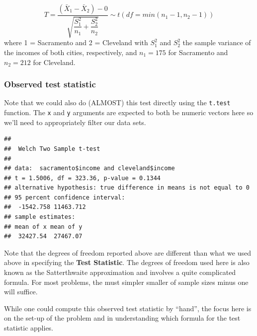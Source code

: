 \documentclass[]{tufte-book}
\newenvironment{Shaded}{\begin{snugshade}}{\end{snugshade}}
\newcommand{\KeywordTok}[1]{\textcolor[rgb]{0.13,0.29,0.53}{\textbf{{#1}}}}
\newcommand{\DataTypeTok}[1]{\textcolor[rgb]{0.13,0.29,0.53}{{#1}}}
\newcommand{\StringTok}[1]{\textcolor[rgb]{0.31,0.60,0.02}{{#1}}}
\newcommand{\NormalTok}[1]{{#1}}
\begin{document}
\[ T =\dfrac{ (\bar{X}_1 - \bar{X}_2) - 0}{ \sqrt{\dfrac{S_1^2}{n_1} + \dfrac{S_2^2}{n_2}}  } \sim t (df = min(n_1 - 1, n_2 - 1)) \]
where 1 = Sacramento and 2 = Cleveland with \(S_1^2\) and \(S_2^2\) the
sample variance of the incomes of both cities, respectively, and
\(n_1 = 175\) for Sacramento and \(n_2 = 212\) for Cleveland.

\subsubsection{Observed test statistic}\label{observed-test-statistic-3}

Note that we could also do (ALMOST) this test directly using the
\texttt{t.test} function. The \texttt{x} and \texttt{y} arguments are
expected to both be numeric vectors here so we'll need to appropriately
filter our data sets.

\begin{Shaded}
\end{Shaded}

\begin{verbatim}
## 
##  Welch Two Sample t-test
## 
## data:  sacramento$income and cleveland$income
## t = 1.5006, df = 323.36, p-value = 0.1344
## alternative hypothesis: true difference in means is not equal to 0
## 95 percent confidence interval:
##  -1542.758 11463.712
## sample estimates:
## mean of x mean of y 
##  32427.54  27467.07
\end{verbatim}

Note that the degrees of freedom reported above are different than what
we used above in specifying the \textbf{Test Statistic}. The degrees of
freedom used here is also known as the Satterthwaite approximation and
involves a quite complicated formula. For most problems, the must
simpler smaller of sample sizes minus one will suffice.

While one could compute this observed test statistic by ``hand'', the
focus here is on the set-up of the problem and in understanding which
formula for the test statistic applies.
\end{document}
